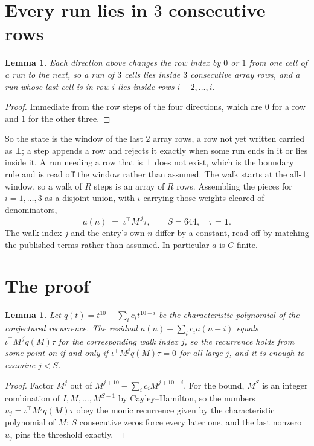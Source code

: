 \documentclass[11pt,a4paper]{article}
\theoremstyle{plain}
\newtheorem{lemma}[theorem]{Lemma}
\theoremstyle{definition}
\begin{document}
\section{Every run lies in $3$ consecutive rows}

\begin{lemma}\label{lem:win}
Each direction above changes the row index by $0$ or $1$ from one cell of a run to the next, so
a run of $3$ cells lies inside $3$ consecutive array rows, and a run whose last cell is in
row $i$ lies inside rows $i-2,\dots,i$.
\end{lemma}

\begin{proof}
Immediate from the row steps of the four directions, which are $0$ for a row and $1$ for the
other three.
\end{proof}

So the state is the window of the last $2$ array rows, a row not yet written carried as
$\bot$; a step appends a row and rejects it exactly when some run ends in it or lies inside it.
A run needing a row that is $\bot$ does not exist, which is the boundary rule and is read off
the window rather than assumed. The walk starts at the all-$\bot$ window, so a walk of $R$ steps
is an array of $R$ rows. Assembling the pieces for $i=1,\dots,3$ as a disjoint union, with $\iota$ carrying those weights cleared of denominators,
\[
a(n)\;=\;\iota^{\!\top}M^{\,j}\tau ,\qquad S=644,\quad\tau=\mathbf{1} .
\]
The walk index $j$ and the entry's own $n$ differ by a constant, read off by matching the
published terms rather than assumed. In particular $a$ is $C$-finite.

\section{The proof}

\begin{lemma}\label{lem:crit}
Let $q(t)=t^{10}-\sum_i c_it^{10-i}$ be the characteristic polynomial of the
conjectured recurrence. The residual $a(n)-\sum_ic_ia(n-i)$ equals
$\iota^{\!\top}M^{\,j}q(M)\tau$ for the corresponding walk index $j$, so the recurrence
holds from some point on if and only if $\iota^{\!\top}M^{j}q(M)\tau=0$ for all large $j$,
and it is enough to examine $j<S$.
\end{lemma}

\begin{proof}
Factor $M^{j}$ out of $M^{j+10}-\sum_ic_iM^{j+10-i}$. For the bound, $M^{S}$
is an integer combination of $I,M,\dots,M^{S-1}$ by Cayley--Hamilton, so the numbers
$u_j=\iota^{\!\top}M^{j}q(M)\tau$ obey the monic recurrence given by the characteristic
polynomial of $M$; $S$ consecutive zeros force every later one, and the last nonzero $u_j$
pins the threshold exactly.
\end{proof}
\end{document}
